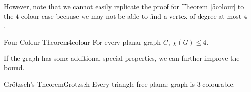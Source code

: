 \documentclass[math, code]{amznotes}
\theoremstyle{remark}
\begin{document}
However, note that we cannot easily replicate the proof for Theorem \ref{5colour} to the $4$-colour case because we may not be able to find a vertex of degree at most $4$. 
\begin{thmbox}{Four Colour Theorem}{4colour}
    For every planar graph $G$, $\chi(G) \leq 4$.
\end{thmbox}
If the graph has some additional special properties, we can further improve the bound.
\begin{thmbox}{Gr\"{o}tzsch's Theorem}{Grotzsch}
    Every triangle-free planar graph is $3$-colourable.
\end{thmbox}
\end{document}
